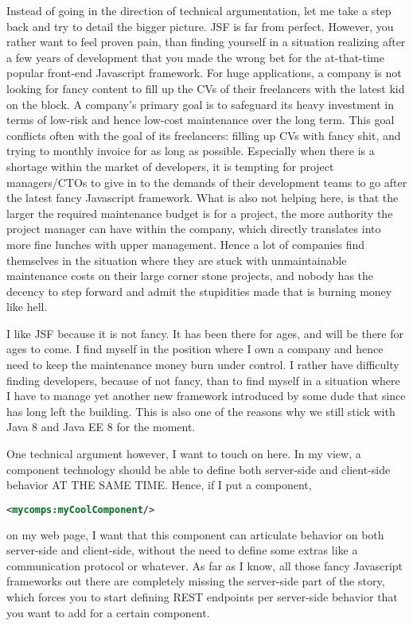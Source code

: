 Instead of going in the direction of technical argumentation, let me take a step back and try to detail the bigger picture.
JSF is far from perfect.
However, you rather want to feel proven pain, than finding yourself in a situation realizing after a few years of development that you made the wrong bet for the at-that-time popular front-end Javascript framework.
For huge applications, a company is not looking for fancy content to fill up the CVs of their freelancers with the latest kid on the block.
A company's primary goal is to safeguard its heavy investment in terms of low-risk and hence low-cost maintenance over the long term.
This goal conflicts often with the goal of its freelancers: filling up CVs with fancy shit, and trying to monthly invoice for as long as possible.
Especially when there is a shortage within the market of developers,
it is tempting for project managers/CTOs to give in to the demands of their development teams to go after the latest fancy Javascript framework.
What is also not helping here, is that the larger the required maintenance budget is for a project,
the more authority the project manager can have within the company,
which directly translates into more fine lunches with upper management.
Hence a lot of companies find themselves in the situation where they are stuck with unmaintainable maintenance costs on their large corner stone projects, and nobody has the decency to step forward and admit the stupidities made that is burning money like hell.

I like JSF because it is not fancy.
It has been there for ages, and will be there for ages to come.
I find myself in the position where I own a company and hence need to keep the maintenance money burn under control.
I rather have difficulty finding developers, because of not fancy, than to find myself in a situation where I have to manage yet another new framework introduced by some dude that since has long left the building.
This is also one of the reasons why we still stick with Java 8 \cite{GoslingJoyEtAl14} and Java EE 8 \cite{JavaEE8} for the moment.

One technical argument however, I want to touch on here.
In my view, a component technology should be able to define both server-side and client-side behavior AT THE SAME TIME.
Hence, if I put a component,
\begin{lstlisting}[language=XML]
	<mycomps:myCoolComponent/>
\end{lstlisting}
on my web page, I want that this component can articulate behavior on both server-side and client-side, without the need to define some extras like a communication protocol or whatever.
As far as I know, all those fancy Javascript frameworks out there are completely missing the server-side part of the story, which forces you to start defining REST endpoints per server-side behavior that you want to add for a certain component.

